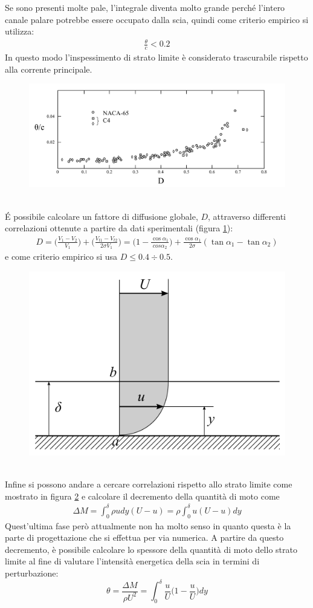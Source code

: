 Se sono presenti molte pale, l'integrale diventa molto grande perché l'intero canale palare potrebbe essere occupato dalla scia, quindi come criterio empirico si utilizza:
\begin{align*}
\frac{\theta}{c} < 0.2
\end{align*}
In questo modo l'inspessimento di strato limite è considerato trascurabile rispetto alla corrente principale. 
\begin{figure}
\centering
  \includegraphics[width=\textwidth]{fig/CritCarico3.pdf}
\caption{}
\label{fig:CritCarico3}
\end{figure}
\\\'E possibile calcolare un fattore di diffusione globale, $D$, attraverso differenti correlazioni ottenute a partire da dati sperimentali (figura \ref{fig:CritCarico3}):
\begin{align*}
D = \bigg( \frac{V_1 - V_2}{V_1} \bigg) + \bigg( \frac{V_{t1} - V_{t2}}{2 \sigma V_1} \bigg) = \bigg( 1 - \frac{\cos \alpha_1}{cos \alpha_2} \bigg) + \frac{\cos \alpha_1}{2 \sigma} (\tan \alpha_1 - \tan \alpha_2)
\end{align*}
e come criterio empirico si usa $ D \leqslant 0.4 \div 0.5  $.
\begin{figure}
\centering
  \includegraphics[width=.4\textwidth]{fig/CritCarico4.pdf}
\caption{}
\label{fig:CritCarico4}
\end{figure}
\\Infine si possono andare a cercare correlazioni rispetto allo strato limite come mostrato in figura \ref{fig:CritCarico4} e calcolare il decremento della quantità di moto come 
\begin{align*}
\Delta M = \int_0^{\delta} \rho u dy (U-u) = \rho \int_0^{\delta} u (U-u) dy
\end{align*} 
Quest'ultima fase però attualmente non ha molto senso in quanto questa è la parte di progettazione che si effettua per via numerica. A partire da questo decremento, è possibile calcolare lo spessore della quantità di moto dello strato limite al fine di valutare l'intensità energetica della scia in termini di perturbazione:
\begin{equation}
\theta = \frac{\Delta M}{\rho U^2} = \int_0^{\delta} \frac{u}{U} \bigg( 1 -\frac{u}{U} \bigg) dy
\end{equation}

